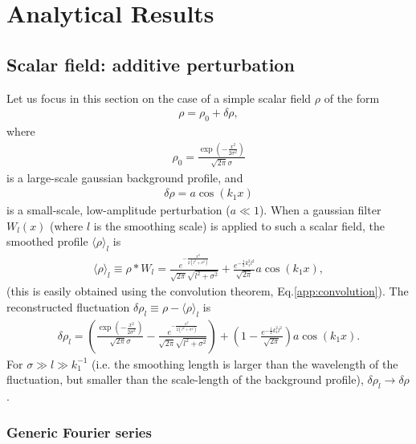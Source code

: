 \documentclass[]{article}
\begin{document}
\section{Analytical Results}


\subsection{Scalar field: additive perturbation}

Let us focus in this section on the case of a simple scalar field $\rho$ of the form
%
\begin{align}
	\rho = \rho_0 + \delta \rho,
\end{align}
%
where
%
\begin{align}
	\rho_0 =\frac{\exp \left(-\frac{x^2}{2 \sigma ^2}\right)}{\sqrt{2 \pi } \sigma }
\end{align}
%
is a large-scale gaussian background profile, and
%
\begin{align}
	\delta \rho = a \cos \left(k_1 x\right)
\end{align}
%
is a small-scale, low-amplitude perturbation ($a \ll 1$). When a gaussian filter $ W_l (x)$ (where $l$ is the smoothing scale) is applied to such a scalar field, the smoothed profile $\langle \rho \rangle_l$ is 
%
\begin{align}
	\langle \rho \rangle_l \equiv \rho * W_l = \frac{e^{-\frac{x^2}{2 \left(l^2+\sigma^2\right)}}}{\sqrt{2 \pi}  \sqrt{l^2+\sigma ^2}} + \frac{e^{-\frac{1}{2} k_1^2 l^2} }{\sqrt{2 \pi }} a \cos (k_1 x),
\end{align}
%
(this is easily obtained using the convolution theorem, Eq.\eqref{app:convolution}). The reconstructed fluctuation $\delta \rho_l \equiv \rho - \langle \rho \rangle_l$ is
%
\begin{align}
	\delta \rho_l = \left( \frac{\exp \left(-\frac{x^2}{2 \sigma ^2}\right)}{\sqrt{2 \pi } \sigma } - \frac{e^{-\frac{x^2}{2 \left(l^2+\sigma^2\right)}}}{\sqrt{2 \pi}  \sqrt{l^2+\sigma ^2}} \right) + \left( 1 - \frac{e^{-\frac{1}{2} k_1^2 l^2} }{\sqrt{2 \pi }} \right) a \cos (k_1 x).
\end{align}
%
For $\sigma \gg l \gg k_1^{-1}$ (i.e. the smoothing length is larger than the wavelength of the fluctuation, but smaller than the scale-length of the background profile), $\delta \rho_l \rightarrow \delta \rho$.

\subsubsection{Generic Fourier series}
\end{document}

